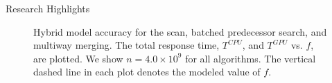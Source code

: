 \documentclass[final]{beamer}
\newlength{\colwidth}
\begin{document}
\begin{frame}[t]
\begin{columns}[t]
\begin{column}{\colwidth}
  \begin{block}{Research Highlights}
\begin{figure}[htp]
\centering
{}

 \caption{Hybrid model accuracy for the scan, batched predecessor search, and multiway merging. The total response time, $T^{CPU}$, and $T^{GPU}$ vs. $f$, are plotted. We show $n=4.0\times10^9$ for all algorithms. The vertical dashed line in each plot denotes the modeled value of $f$.}

 \label{fig:time_vs_f}
\end{figure}



\end{block}
\end{column}
\end{columns}
\end{frame}
\end{document}
